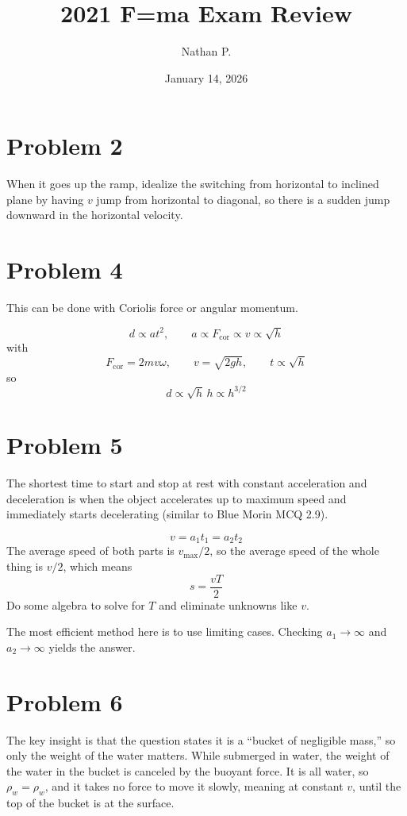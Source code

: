 \documentclass[11pt]{article}
\title{2021 F=ma Exam Review}
\author{Nathan P.}
\date{January 14, 2026}
\begin{document}
\maketitle

\section*{Problem 2}
\hspace*{\parindent} When it goes up the ramp, idealize the switching from horizontal to inclined plane by having $v$ jump from horizontal to diagonal, so there is a sudden jump downward in the horizontal velocity.

\section*{Problem 4}
\hspace*{\parindent} This can be done with Coriolis force or angular momentum.

\[
d\propto at^2, \qquad a\propto F_{\mathrm{cor}}\propto v\propto \sqrt{h}
\]
with
\[
F_{\mathrm{cor}}=2mv\omega, \qquad v=\sqrt{2gh}, \qquad t\propto \sqrt{h}
\]
so
\[
d\propto \sqrt{h}\,h\propto h^{3/2}
\]

\section*{Problem 5}
\hspace*{\parindent} The shortest time to start and stop at rest with constant acceleration and deceleration is when the object accelerates up to maximum speed and immediately starts decelerating (similar to Blue Morin MCQ 2.9).

\[
v=a_1t_1=a_2t_2
\]
The average speed of both parts is $v_{\max}/2$, so the average speed of the whole thing is $v/2$, which means
\[
s=\frac{vT}{2}
\]
Do some algebra to solve for $T$ and eliminate unknowns like $v$.

The most efficient method here is to use limiting cases. Checking $a_1\to\infty$ and $a_2\to\infty$ yields the answer.

\section*{Problem 6}
\hspace*{\parindent} The key insight is that the question states it is a ``bucket of negligible mass,'' so only the weight of the water matters. While submerged in water, the weight of the water in the bucket is canceled by the buoyant force. It is all water, so $\rho_w=\rho_w$, and it takes no force to move it slowly, meaning at constant $v$, until the top of the bucket is at the surface.
\end{document}
